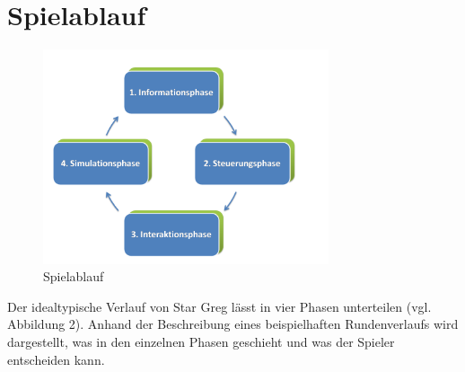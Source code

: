 \section{Spielablauf}
\label{sec:spielwelt-regeln}

\begin{figure}[h]
\centering
\includegraphics[width=0.75\textwidth]{20_Spielwelt/40_Regeln_Ablauf/Spielablauf.png}
\caption{Spielablauf}
\end{figure}


Der idealtypische Verlauf von Star Greg lässt in vier Phasen unterteilen (vgl. Abbildung 2). Anhand der Beschreibung eines beispielhaften Rundenverlaufs wird dargestellt, was in den einzelnen Phasen geschieht und was der Spieler entscheiden kann.










